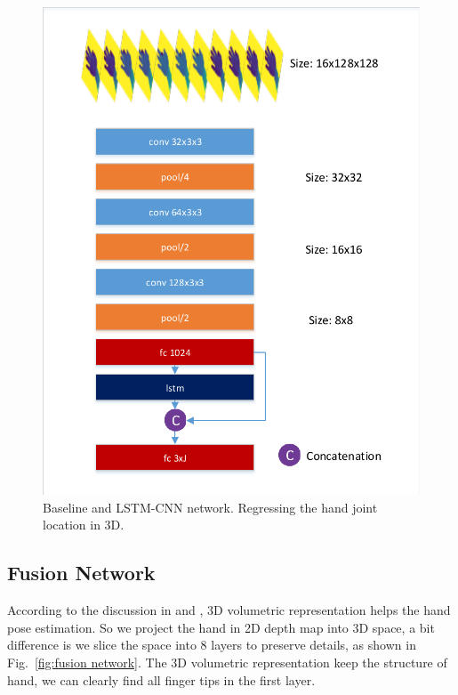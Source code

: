 \documentclass[journal,comsoc]{IEEEtran}
\let\MYoriglatexcaption\caption
\renewcommand{\caption}[2][\relax]{\MYoriglatexcaption[#2]{#2}}
\begin{document}
\begin{figure}[t]
{\begin{minipage}[t]{240pt}
            \includegraphics[width=1\linewidth]{src/network/lstm.pdf}
        \end{minipage}
    }
\caption{Baseline and LSTM-CNN network. Regressing the hand joint location in 3D.}
\label{fig:baseline and lstm network}
\end{figure}


\subsection{Fusion Network}\label{sec:fusion network}
According to the discussion in \cite{supancic2015depth} and \cite{deng2017hand3d}, 3D volumetric representation helps the hand
pose estimation. So we project the hand in 2D depth map into 3D space, a bit difference is we slice the space into 8 layers to
preserve details, as shown in Fig.~\ref{fig:fusion network}. The 3D volumetric representation keep the structure of hand, we
can clearly find all finger tips in the first layer.
\end{document}
